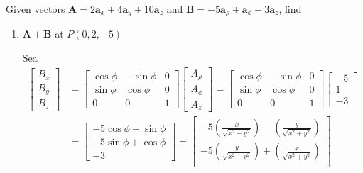\begin{problema}

    Given vectors $\mathbf{A}=2 \mathbf{a}_{x}+4 \mathbf{a}_{y}+10 \mathbf{a}_{z}$ and $\mathbf{B}=-5 \mathbf{a}_{\rho}+\mathbf{a}_{\phi}-3 \mathbf{a}_{z}$,
    find

    \begin{enumerate}
        \item $\mathbf{A}+\mathbf{B}$ at $P(0,2,-5)$
        \begin{sol}
            Sea
        \begin{align*}\begin{bmatrix}
            B_x\\
            B_y\\
            B_z
        \end{bmatrix}
             &= \begin{bmatrix}
                \cos\phi & -\sin \phi & 0\\
                \sin \phi & \cos\phi & 0\\
                0& 0&1 
            \end{bmatrix}\begin{bmatrix}
                A_\rho\\
                A_\phi\\
                A_z
            \end{bmatrix}= \begin{bmatrix}
                \cos\phi & -\sin \phi & 0\\
                \sin \phi & \cos\phi & 0\\
                0& 0&1 
            \end{bmatrix}\begin{bmatrix}
                -5\\
                1\\
                -3
            \end{bmatrix}\\
            &=\begin{bmatrix}
                -5\cos\phi -\sin \phi \\
            -5\sin \phi + \cos\phi \\
                -3
            \end{bmatrix} =\begin{bmatrix}
                -5\left(\frac{x}{\sqrt{x^2+y^2}}\right) -\left(\frac{y}{\sqrt{x^2+y^2}}\right) \\
            -5\left(\frac{y}{\sqrt{x^2+y^2}}\right)+ \left(\frac{x}{\sqrt{x^2+y^2}}\right) \\

\end{bmatrix}
\end{align*}
\end{sol}
\end{enumerate}
\end{problema}
